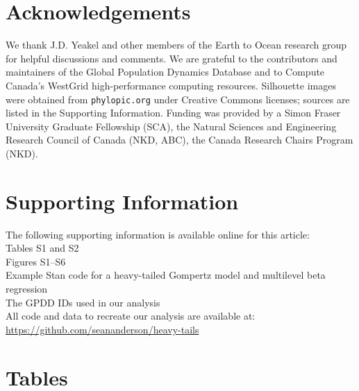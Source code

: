 \section{Acknowledgements}

We thank J.D. Yeakel and other members of the Earth to Ocean research
group for helpful discussions and comments. We are grateful to the
contributors and maintainers of the Global Population Dynamics Database and to
Compute Canada's WestGrid high-performance computing resources. Silhouette
images were obtained from \texttt{phylopic.org} under Creative Commons
licenses; sources are listed in the Supporting Information. Funding was
provided by a Simon Fraser University Graduate Fellowship (SCA), the Natural
Sciences and Engineering Research Council of Canada (NKD, ABC), the Canada
Research Chairs Program (NKD).

\section{Supporting Information}

The following supporting information is available online for this article:\\
Tables S1 and S2\\
Figures S1--S6\\
Example Stan code for a heavy-tailed Gompertz model and multilevel beta
regression\\
The GPDD IDs used in our analysis\\
All code and data to recreate our analysis are available at:\\
\url{https://github.com/seananderson/heavy-tails}




\clearpage

\section{Tables}



\clearpage

